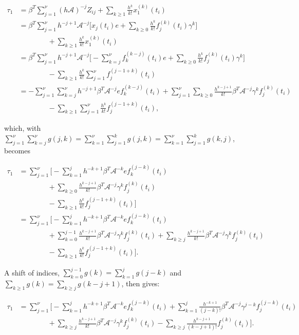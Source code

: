 \documentclass[]{book}
\theoremstyle{definition}
\theoremstyle{definition}
\theoremstyle{definition}
\theoremstyle{remark}
\begin{document}
\begin{align*}
\tau_1 &= \beta^T\sum_{j=1}^\nu (h\mathcal A)^{-j}Z_{ij} + \sum_{k\geq 1} \frac{h^k}{k!}x_1^{(k)}(t_i)\\
&= \beta^T\sum_{j=1}^\nu h^{-j+1}\mathcal A^{-j}\bigr[ x_{j}(t_i)e+\sum_{k\geq 0} \frac{h^k}{k!}f_j^{(k)}(t_i)\gamma^k\bigr] \\&\quad\quad\quad\quad+ \sum_{k\geq 1} \frac{h^k}{k!}x_1^{(k)}(t_i)\\
&= \beta^T\sum_{j=1}^\nu h^{-j+1}\mathcal A^{-j}\bigr[ -\sum_{k=j}^{\nu}f_k^{(k-j)}(t_i)e+\sum_{k\geq 0} \frac{h^k}{k!}f_j^{(k)}(t_i)\gamma^k\bigr] \\&\quad\quad\quad\quad- \sum_{k\geq 1} \frac{h^k}{k!} \sum_{j=1}^{\nu}f_j^{(j-1+k)}(t_i)\\
&= -\sum_{j=1}^\nu \sum_{k=j}^{\nu} h^{-j+1}\beta^T\mathcal A^{-j} ef_k^{(k-j)}(t_i)+\sum_{j=1}^\nu \sum_{k\geq 0}\frac{h^{k-j+1}}{k!}\beta^T\mathcal A^{-j} \gamma^k f_j^{(k)}(t_i) \\&\quad\quad\quad\quad- \sum_{k\geq 1}\sum_{j=1}^{\nu} \frac{h^k}{k!} f_j^{(j-1+k)}(t_i),
\end{align*}

which, with
\(\sum_{j=1}^\nu \sum_{k=j}^\nu g(j,k) = \sum_{k=1}^\nu \sum_{j=1}^k g(j,k)= \sum_{k=1}^\nu \sum_{j=1}^k g(k,j)\),
becomes

\begin{align*}
\tau_1 &= \sum_{j=1}^{\nu} \bigl[ -\sum_{k=1}^j h^{-k+1}\beta^T\mathcal A^{-k} ef_k^{(j-k)}(t_i)\\&\quad\quad\quad\quad+\sum_{k\geq 0}\frac{h^{k-j+1}}{k!}\beta^T\mathcal A^{-j} \gamma^k f_j^{(k)}(t_i) \\&\quad\quad\quad\quad- \sum_{k\geq 1}\frac{h^k}{k!} f_j^{(j-1+k)}(t_i) \bigr] \\
 &= \sum_{j=1}^{\nu} \bigl[ -\sum_{k=1}^j h^{-k+1}\beta^T\mathcal A^{-k} ef_k^{(j-k)}(t_i)\\
 &\quad\quad\quad\quad+\sum_{k=0}^{j-1}\frac{h^{k-j+1}}{k!}\beta^T\mathcal A^{-j} \gamma^k f_j^{(k)}(t_i)+\sum_{k\geq j}\frac{h^{k-j+1}}{k!}\beta^T\mathcal A^{-j} \gamma^k f_j^{(k)}(t_i) \\&\quad\quad\quad\quad- \sum_{k\geq 1}\frac{h^k}{k!} f_j^{(j-1+k)}(t_i) \bigr].
\end{align*}

A shift of indices, \(\sum_{k=0}^{j-1}g(k)=\sum_{k=1}^j g(j-k)\) and
\(\sum_{k\geq 1}g(k)=\sum_{k\geq j}g(k-j+1)\), then gives:

\begin{align*}
    \tau_1 &= \sum_{j=1}^{\nu} \bigl[ -\sum_{k=1}^j h^{-k+1}\beta^T\mathcal A^{-k} ef_k^{(j-k)}(t_i)+\sum_{k=1}^{j}\frac{h^{-k+1}}{(j-k)!}\beta^T\mathcal A^{-j} \gamma^{j-k} f_j^{(j-k)}(t_i)\\ &\quad\quad\quad\quad+\sum_{k\geq j}\frac{h^{k-j+1}}{k!}\beta^T\mathcal A^{-j} \gamma^k f_j^{(k)}(t_i) - \sum_{k\geq j}\frac{h^{k-j+1}}{(k-j+1)!} f_j^{(k)}(t_i) \bigr].
\end{align*}
\end{document}

